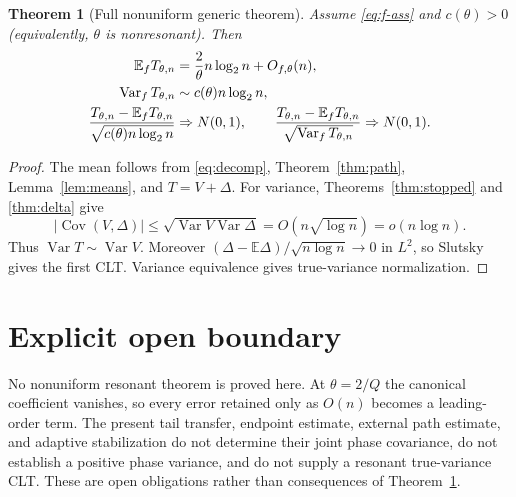 \documentclass[11pt]{article}
\numberwithin{equation}{section}
\newtheorem{theorem}{Theorem}[section]
\newcommand{\E}{\mathbb E}\newcommand{\Pp}{\mathbb P}
\newcommand{\Var}{\operatorname{Var}}\newcommand{\Cov}{\operatorname{Cov}}
\newcommand{\1}{\mathbf 1}\newcommand{\F}{\mathcal F}\newcommand{\D}{\mathcal D}
\begin{document}
\begin{theorem}[Full nonuniform generic theorem]\label{thm:full}
Assume \eqref{eq:f-ass} and $c(\theta)>0$ (equivalently, $\theta$ is
nonresonant).  Then
\begin{align*}
 \E_fT_{\theta,n}&={2\over\theta}n\log_2n+O_{f,\theta}(n),\\
 \Var_fT_{\theta,n}&\sim c(\theta)n\log_2n,\\
 {T_{\theta,n}-\E_fT_{\theta,n}\over\sqrt{c(\theta)n\log_2n}}
 &\Rightarrow N(0,1),\qquad
 {T_{\theta,n}-\E_fT_{\theta,n}\over\sqrt{\Var_fT_{\theta,n}}}
 \Rightarrow N(0,1).
\end{align*}
\end{theorem}
\begin{proof}
The mean follows from \eqref{eq:decomp}, Theorem~\ref{thm:path},
Lemma~\ref{lem:means}, and $T=V+\Delta$.  For variance,
Theorems~\ref{thm:stopped} and \ref{thm:delta} give
\[
 |\Cov(V,\Delta)|\le\sqrt{\Var V\Var\Delta}
 =O(n\sqrt{\log n})=o(n\log n).
\]
Thus $\Var T\sim\Var V$.  Moreover
$(\Delta-\E\Delta)/\sqrt{n\log n}\to0$ in $L^2$, so Slutsky gives the first
CLT.  Variance equivalence gives true-variance normalization.
\end{proof}

\section{Explicit open boundary}
No nonuniform resonant theorem is proved here.  At $\theta=2/Q$ the canonical
coefficient vanishes, so every error retained only as $O(n)$ becomes a
leading-order term.  The present tail transfer, endpoint estimate, external
path estimate, and adaptive stabilization do not determine their joint
phase covariance, do not establish a positive phase variance, and do not
supply a resonant true-variance CLT.  These are open obligations rather than
consequences of Theorem~\ref{thm:full}.
\end{document}
